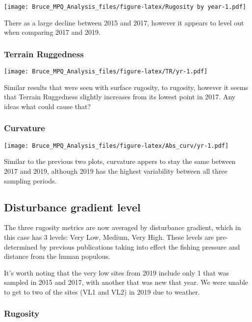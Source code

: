 \documentclass[]{article}
\begin{document}
\texttt{[image: Bruce\_MPQ\_Analysis\_files/figure-latex/Rugosity by year-1.pdf]}

There as a large decline between 2015 and 2017, however it appears to
level out when comparing 2017 and 2019.

\hypertarget{terrain-ruggedness}{%
\subsubsection{Terrain Ruggedness}\label{terrain-ruggedness}}

\texttt{[image: Bruce\_MPQ\_Analysis\_files/figure-latex/TR/yr-1.pdf]}

Similar results that were seen with surface rugosity, to rugosity,
however it seems that Terrain Ruggedness slightly increases from its
lowest point in 2017. Any ideas what could cause that?

\hypertarget{curvature}{%
\subsubsection{Curvature}\label{curvature}}

\texttt{[image: Bruce\_MPQ\_Analysis\_files/figure-latex/Abs\_curv/yr-1.pdf]}

Similar to the previous two plots, curvature appers to stay the same
between 2017 and 2019, although 2019 has the highest variability between
all three sampling periods.

\hypertarget{disturbance-gradient-level}{%
\subsection{Disturbance gradient
level}\label{disturbance-gradient-level}}

The three rugosity metrics are now averaged by disturbance gradient,
which in this case has 3 levels: Very Low, Medium, Very High. These
levels are pre-determined by previous publications taking into effect
the fishing pressure and distance from the human populous.

It's worth noting that the very low sites from 2019 include only 1 that
was sampled in 2015 and 2017, with another that was new that year. We
were unable to get to two of the sites (VL1 and VL2) in 2019 due to
weather.

\hypertarget{rugosity-1}{%
\subsubsection{Rugosity}\label{rugosity-1}}
\end{document}
